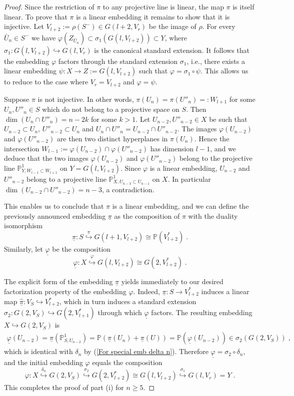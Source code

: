 \documentclass[12pt]{amsart}
\def\PP {{\mathbb P}}     %
\def\hw  {\hookrightarrow}
\def\ul  {\underline}
\begin{document}
\begin{proof}
Since the restriction of $\pi$ to any projective line is linear, the map $\pi$ is itself linear. To prove that $\pi$ is a linear embedding it remains to show that it is injective. Let $V_{l+2}:=\rho(S^-)\in G(l+2,V_r)$ be the image of $\rho$. For every $\bar U_n\in S^-$ we have $\varphi(Z_{\bar U_n})\subset \sigma_1(G(l,V_{l+2}))\subset Y$, where $\sigma_1:G(l,V_{l+2})\hw G(l,V_r)$ is the canonical standard extension. It follows that the embedding $\varphi$ factors through the standard extension $\sigma_1$, i.e., there exists a linear embedding $\psi:X\to Z:=G(l,V_{l+2})$ such that $\varphi=\sigma_1\circ \psi$. This allows us to reduce to the case where $V_r=V_{l+2}$ and $\varphi=\psi$.

Suppose $\pi$ is not injective. In other words, $\pi(U_n)=\pi(U''_n)=:W_{l+1}$ for some $U_n,U''_n\in S$ which do not belong to a projective space on $S$. Then $\dim (U_n\cap U''_n)=n-2k$ for some $k>1$. Let $U_{n-2},U''_{n-2}\in X$ be such that $U_{n-2}\subset U_n$, $U''_{n-2}\subset U_n$ and $U_n\cap U''_n = U_{n-2}\cap U''_{n-2}$. The images $\varphi(U_{n-2})$ and $\varphi(U''_{n-2})$ are then two distinct hyperplanes in $\pi(U_n)$. Hence the intersection $W_{l-1}:=\varphi(U_{n-2})\cap\varphi(U''_{n-2})$ has dimension $l-1$, and we deduce that the two images $\varphi(U_{n-2})$ and $\varphi(U''_{n-2})$ belong to the projective line $\PP^1_{Y,W_{l-1}\subset W_{l+1}}$ on $Y=G(l,V_{l+2})$. Since $\varphi$ is a linear embedding, $U_{n-2}$ and $U''_{n-2}$ belong to a projective line $\PP^1_{X,U_{n-3}\subset U_{n-1}}$ on $X$. In particular $\dim (U_{n-2}\cap U''_{n-2})=n-3$, a contradiction.

This enables us to conclude that $\pi$ is a linear embedding, and we can define the previously announced embedding $\ul{\pi}$ as the composition of $\pi$ with the duality isomorphism
$$
\ul{\pi}: S \stackrel{\pi}{\hw} G(l+1,V_{l+2}) \cong \PP(V^*_{l+2}) \;.
$$
Similarly, let $\ul{\varphi}$ be the composition
$$
\ul{\varphi}: X \stackrel{\varphi}{\hw} G(l,V_{l+2})\cong G(2,V_{l+2}^*) \;.
$$

The explicit form of the embedding $\ul{\pi}$ yields immediately to our desired factorization property of the embedding $\varphi$. Indeed, $\ul\pi:S\to V_{l+2}^*$ induces a linear map $\ul{\hat\pi}: V_S\hookrightarrow V_{l+2}^*$, which in turn induces a standard extension $\sigma_2:G(2,V_S)\hw G(2,V_{l+1}^*)$ through which $\ul{\varphi}$ factors. The resulting embedding $X\hw G(2,V_S)$ is
\begin{gather*}
\ul{\varphi}(U_{n-2})=\ul{\pi}(\PP^1_{S,U_{n-2}})=\PP(\ul{\pi}(U_n)+\ul{\pi}(U))=\PP(\ul{\varphi}(U_{n-2}))\in \sigma_2(G(2,V_S))\;,
\end{gather*}
which is identical with $\delta_n$ by (\ref{For special emb delta n}). Therefore $\ul{\varphi}=\sigma_2\circ\delta_n$, and the initial embedding $\varphi$ equals the composition
$$
\varphi: X\stackrel{\delta_n}{\hw} G(2,V_S) \stackrel{\sigma_2}{\hw} G(2,V_{l+2}^*) \cong G(l,V_{l+2}) \stackrel{\sigma_1}{\hw} G(l,V_r)=Y\;.
$$
This completes the proof of part (i) for $n\geq 5$.


\end{proof}
\end{document}
